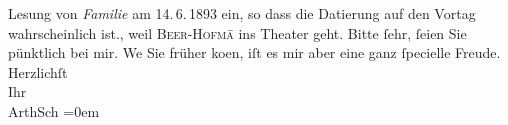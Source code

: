 \begin{ledgroupsized}[t]{13cm}
{{{                  Lesung von \emph{Familie} am 14. 6. 1893 ein, so
                  dass die Datierung auf den Vortag wahrscheinlich ist.}}}\label{K_L02954-1h}, weil \textsc{Beer-Hofma{\geminationn}}̄ ins Theater geht. Bitte ſehr, ſeien {\pb}Sie pünktlich bei mir. We{\geminationn} Sie früher ko{\geminationm}en, iſt es mir aber eine ganz ſpecielle Freude. \pend
           \pstart
           {\pb}Herzlichſt {\\[\baselineskip]}Ihr {\\[\baselineskip]}\spacefill\mbox{ArthSch}\pend
           \leftskip=0em{}
         
         \endnumbering{}\end{ledgroupsized}\begin{anhang}\end{anhang}\newcommand{\dateiname}{L02954}\newcommand{\titel}{Arthur Schnitzler an Felix Salten, [13. 6. 1893?]}\newcommand{\editorInnen}{Martin Anton Müller und Laura Untner}
      